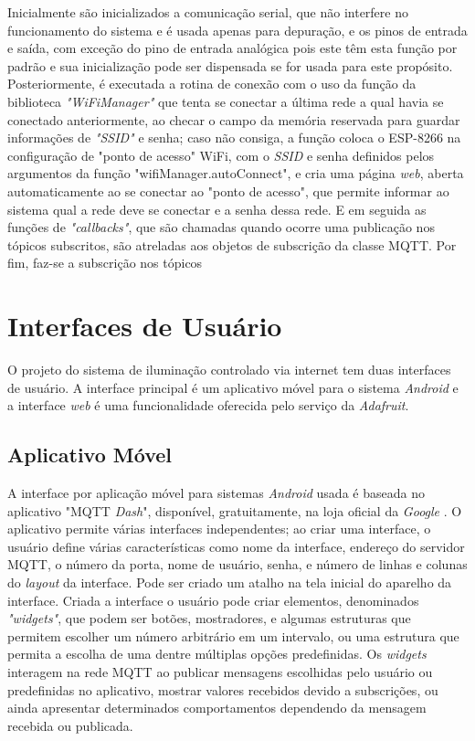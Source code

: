 Inicialmente são inicializados a comunicação serial, que não interfere no funcionamento do sistema e é usada apenas para depuração, e os pinos de entrada e saída, com exceção do pino de entrada analógica pois este têm esta função por padrão e sua inicialização pode ser dispensada se for usada para este propósito. Posteriormente, é executada a rotina de conexão com o uso da função da biblioteca \textit{"WiFiManager"} \cite{wifimng} que tenta se conectar a última rede a qual havia se conectado anteriormente, ao checar o campo da memória reservada para guardar informações de \textit{"SSID"} e senha; caso não consiga, a função coloca o ESP-8266 na configuração de "ponto de acesso" WiFi, com o \textit{SSID} e senha definidos pelos argumentos da função "wifiManager.autoConnect", e cria uma página \textit{web}, aberta automaticamente ao se conectar ao "ponto de acesso", que permite informar ao sistema qual a rede deve se conectar e a senha dessa rede. E em seguida as funções de \textit{"callbacks"}, que são chamadas quando ocorre uma publicação nos tópicos subscritos, são atreladas aos objetos de subscrição da classe MQTT. Por fim, faz-se a subscrição nos tópicos

\section{Interfaces de Usuário}

O projeto do sistema de iluminação controlado via internet tem duas interfaces de usuário. A interface principal é um aplicativo móvel para o sistema \textit{Android} e a interface \textit{web} é uma funcionalidade oferecida pelo serviço da \textit{Adafruit}.

\subsection{Aplicativo Móvel}

A interface por aplicação móvel para sistemas \textit{Android} usada é baseada no aplicativo "MQTT \textit{Dash}", disponível, gratuitamente, na loja oficial da \textit{Google} \cite{dash}. O aplicativo permite várias interfaces independentes; ao criar uma interface, o usuário define várias características como nome da interface, endereço do servidor MQTT, o número da porta, nome de usuário, senha, e número de linhas e colunas do \textit{layout} da interface. Pode ser criado um atalho na tela inicial do aparelho da interface. Criada a interface o usuário pode criar elementos, denominados \textit{"widgets"}, que podem ser botões, mostradores, e algumas estruturas que permitem escolher um número arbitrário em um intervalo, ou uma estrutura que permita a escolha de uma dentre múltiplas opções predefinidas. Os \textit{widgets} interagem na rede MQTT ao publicar mensagens escolhidas pelo usuário ou predefinidas no aplicativo, mostrar valores recebidos devido a subscrições, ou ainda apresentar determinados comportamentos dependendo da mensagem recebida ou publicada.

